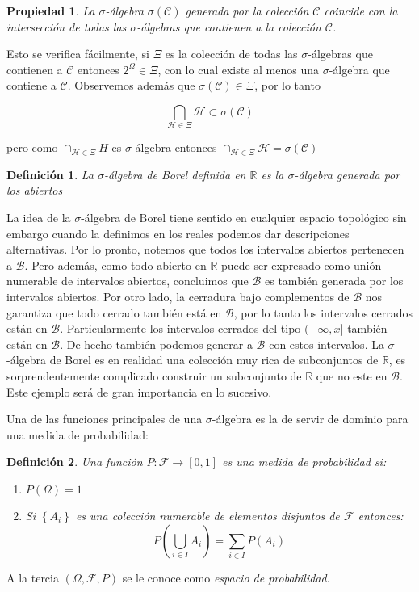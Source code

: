 \documentclass{extreport}
\makeatletter
\theoremstyle{definicion}
\newtheorem{definition}{Definición}[chapter]
\theoremstyle{propiedad}
\newtheorem{propiedad}{Propiedad}[chapter]
\renewenvironment{proof}[1][\proofname]{\par
    \pushQED{\qed}%
    \normalfont \topsep6\p@\@plus6\p@\relax
    \trivlist
    \item\relax
            {\itshape
        #1\@addpunct{.}}\hspace\labelsep\ignorespaces
}{%
    \popQED\endtrivlist\@endpefalse
}
\makeatother
\begin{document}
\begin{propiedad}
La $\sigma$-álgebra $\sigma(\mathcal{C})$ generada por la colección $\mathcal{C}$ coincide con la intersección de todas las $\sigma$-álgebras que contienen a la colección $\mathcal{C}$.
\end{propiedad}
\begin{proof}
\par Esto se verifica fácilmente, si $\Xi$ es la colección de todas las $\sigma$-álgebras que contienen a $\mathcal{C}$ entonces $2^\Omega\in\Xi$, con lo cual existe al menos una $\sigma$-álgebra que contiene a $\mathcal{C}$. Observemos además que $\sigma(\mathcal{C})\in\Xi$, por lo tanto 

$$
\bigcap_{\mathcal{H}\in\Xi}\mathcal{H} \subset \sigma(\mathcal{C})
$$

pero como $\cap_{\mathcal{H}\in \Xi}H$ es $\sigma$-álgebra entonces $\cap_{\mathcal{H}\in\Xi}\mathcal{H} = \sigma(\mathcal{C})$
\end{proof}

\begin{definition}
La $\sigma$-álgebra de Borel definida en $\mathbb{R}$ es la $\sigma$-álgebra generada por los abiertos    
\end{definition}

La idea de la $\sigma$-álgebra de Borel tiene sentido en cualquier espacio topológico sin embargo cuando la definimos en los reales podemos dar descripciones alternativas. Por lo pronto, notemos que todos los intervalos abiertos pertenecen a $\mathcal{B}.$ Pero además, como todo abierto en $\mathbb{R}$ puede ser expresado como unión numerable de intervalos abiertos, concluimos que $\mathcal{B}$ es también generada por los intervalos abiertos. Por otro lado, la cerradura bajo complementos de $\mathcal{B}$ nos garantiza que todo cerrado también está en $\mathcal{B}$, por lo tanto los intervalos cerrados están en $\mathcal{B}$. Particularmente los intervalos cerrados del tipo $(-\infty, x]$ también están en $\mathcal{B}$. De hecho también podemos generar a $\mathcal{B}$ con estos intervalos. La $\sigma$-álgebra de Borel es en realidad una colección muy rica de subconjuntos de $\mathbb{R}$, es sorprendentemente complicado construir un subconjunto de $\mathbb{R}$ que no este en $\mathcal{B}$.  Este ejemplo será de gran importancia en lo sucesivo.

Una de las funciones principales de una $\sigma$-álgebra es la de servir de dominio para una medida de probabilidad:


\begin{definition}
Una función $P:\mathcal{F}\rightarrow [0,1]$  es una medida de probabilidad si:
\begin{enumerate}
    \item $P(\Omega) = 1$
    \item Si $\left\{A_i\right\}$ es una colección numerable de elementos disjuntos de $\mathcal{F}$ entonces:
    $$
        P\left(\bigcup_{i\in I} A_i\right) =  \sum_{i\in I} P(A_i) 
    $$
\end{enumerate}    
\end{definition}
A la tercia $(\Omega, \mathcal{F}, P)$ se le conoce como \emph{espacio de probabilidad}. 
\end{document}
